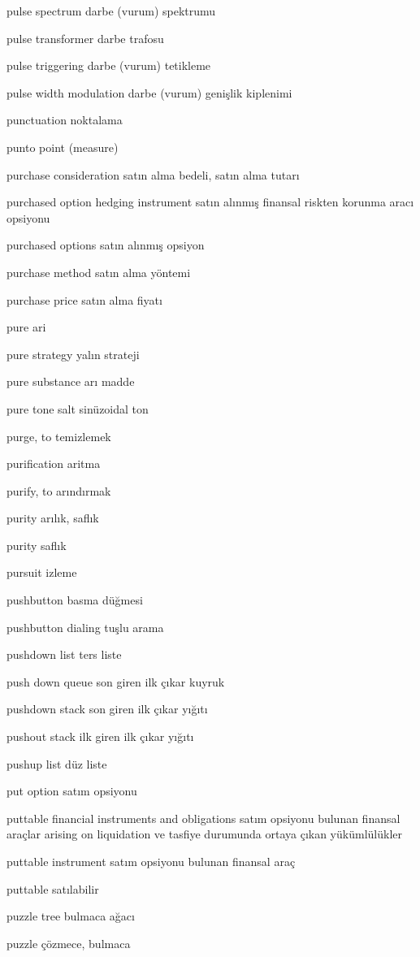 \documentclass[12pt,fleqn]{article}\usepackage{../../common}
\begin{document}
pulse spectrum darbe (vurum) spektrumu

pulse transformer darbe trafosu

pulse triggering darbe (vurum) tetikleme

pulse width modulation darbe (vurum) genişlik kiplenimi

punctuation noktalama

punto point (measure)

purchase consideration satın alma bedeli, satın alma tutarı

purchased option hedging instrument satın alınmış finansal riskten korunma aracı opsiyonu

purchased options satın alınmış opsiyon

purchase method satın alma yöntemi

purchase price satın alma fiyatı

pure ari

pure strategy yalın strateji

pure substance arı madde

pure tone salt sinüzoidal ton

purge, to temizlemek

purification aritma

purify, to arındırmak

purity arılık, saflık

purity saflık

pursuit izleme

pushbutton basma düğmesi

pushbutton dialing tuşlu arama

pushdown list ters liste

push down queue son giren ilk çıkar kuyruk

pushdown stack son giren ilk çıkar yığıtı

pushout stack ilk giren ilk çıkar yığıtı

pushup list düz liste

put option satım opsiyonu

puttable financial instruments and obligations satım opsiyonu bulunan finansal araçlar arising on liquidation ve tasfiye durumunda ortaya çıkan yükümlülükler

puttable instrument satım opsiyonu bulunan finansal araç

puttable satılabilir

puzzle tree bulmaca ağacı

puzzle çözmece, bulmaca
\end{document}
